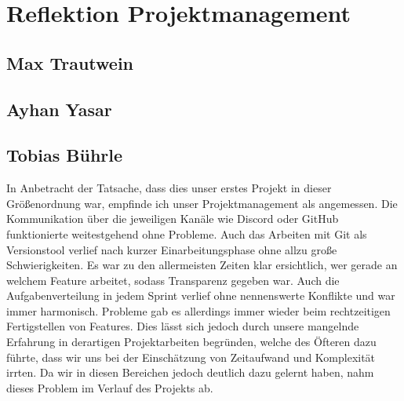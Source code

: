\chapter{Reflektion Projektmanagement}\label{ch:reflektion-projektmanagement}


\section{Max Trautwein}


\section{Ayhan Yasar}


\section{Tobias Bührle}
In Anbetracht der Tatsache, dass dies unser erstes Projekt in dieser Größenordnung war,
empfinde ich unser Projektmanagement als angemessen. Die Kommunikation über die jeweiligen
Kanäle wie Discord oder GitHub funktionierte weitestgehend ohne Probleme. Auch das
Arbeiten mit Git als Versionstool verlief nach kurzer Einarbeitungsphase ohne allzu große
Schwierigkeiten. Es war zu den allermeisten Zeiten klar ersichtlich, wer gerade an welchem
Feature arbeitet, sodass Transparenz gegeben war. Auch die Aufgabenverteilung in jedem
Sprint verlief ohne nennenswerte Konflikte und war immer harmonisch. Probleme gab es
allerdings immer wieder beim rechtzeitigen Fertigstellen von Features. Dies lässt sich
jedoch durch unsere mangelnde Erfahrung in derartigen Projektarbeiten begründen, welche
des Öfteren dazu führte, dass wir uns bei der Einschätzung von Zeitaufwand und Komplexität
irrten. Da wir in diesen Bereichen jedoch deutlich dazu gelernt haben, nahm dieses Problem
im Verlauf des Projekts ab.

